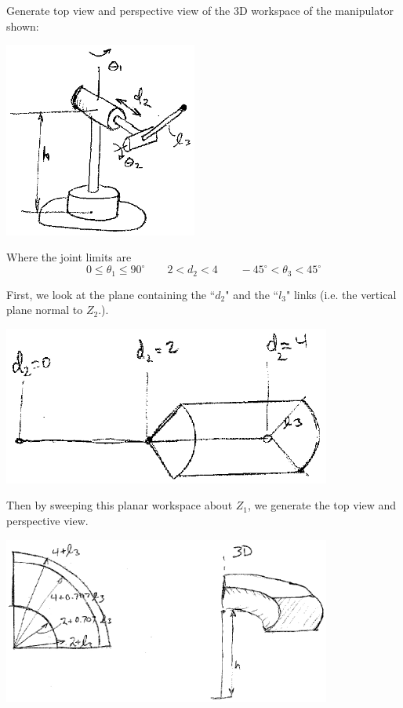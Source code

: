 \begin{Example}
Generate top view and perspective view of the 3D workspace of the manipulator shown:

\includegraphics[width=2.5in]{figs04/00447.eps}

Where the joint limits are
\[
0 \le  \theta_1  \le 90^\circ     \qquad
2 <  d_2 < 4			 \qquad
-45^\circ  <  \theta_3 < 45^\circ
\]

First, we look at the plane containing the ``$d_2$" and the ``$l_3$" links (i.e. the vertical plane normal to $Z_2$.).

\includegraphics[width=4.25in]{figs04/00448a.eps}

Then by sweeping this planar workspace about $Z_1$, we generate the top view and perspective view.

\includegraphics[width=4.25in]{figs04/00448b.eps}


\end{Example}


